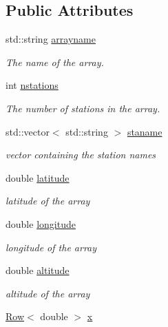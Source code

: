 \subsection*{Public Attributes}
\begin{DoxyCompactItemize}
\item 
std::string \hyperlink{classcArray_a06fe8c046d4fbc0683787ab848d481fd}{arrayname}
\begin{DoxyCompactList}\small\item\em The name of the array. \item\end{DoxyCompactList}\item 
int \hyperlink{classcArray_ab9cbddaf61761740b3e29d2e4a9f51be}{nstations}
\begin{DoxyCompactList}\small\item\em The number of stations in the array. \item\end{DoxyCompactList}\item 
std::vector$<$ std::string $>$ \hyperlink{classcArray_abec1550010524d5c802f6b3bad7c69fe}{staname}
\begin{DoxyCompactList}\small\item\em vector containing the station names \item\end{DoxyCompactList}\item 
double \hyperlink{classcArray_a9508d1287d4349f6e5aa37a903512237}{latitude}
\begin{DoxyCompactList}\small\item\em latitude of the array \item\end{DoxyCompactList}\item 
double \hyperlink{classcArray_a216223dbb53b67e9035279018ce1d599}{longitude}
\begin{DoxyCompactList}\small\item\em longitude of the array \item\end{DoxyCompactList}\item 
double \hyperlink{classcArray_a463ca1e9dcdf170d0e58bd937fdf2369}{altitude}
\begin{DoxyCompactList}\small\item\em altitude of the array \item\end{DoxyCompactList}\item 
\hyperlink{classRow}{Row}$<$ double $>$ \hyperlink{classcArray_a7479fa16d4d43f5c8d70e402ae99f198}{x}

\end{DoxyCompactItemize}
